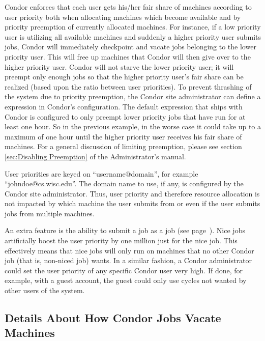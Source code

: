 Condor enforces that each user gets his/her fair share of machines
according to user priority both when allocating machines which become
available and by priority preemption of currently allocated machines.
For instance, if a low priority user is utilizing all available machines
and suddenly a higher priority user submits jobs, Condor will
immediately checkpoint and vacate jobs belonging to the lower priority
user. This will free up machines that Condor will then give over to the
higher priority user. Condor will not starve the lower priority user; it
will preempt only enough jobs so that the higher priority user's fair
share can be realized (based upon the ratio between user priorities). To
prevent thrashing of the system due to priority preemption, the Condor 
site administrator can define a  expression in Condor's configuration.
The default expression that ships with Condor is configured to only preempt 
lower priority jobs that have run
for at least one hour. So in the previous example, in the worse case it
could take up to a maximum of one hour until the higher priority user
receives his fair share of machines.
For a general discussion of
limiting preemption,
please see
section \ref{sec:Disabling Preemption} of the Administrator's manual.

User priorities are keyed on ``username@domain'', for example
``johndoe@cs.wisc.edu''. The domain name to use, if any, is configured by
the Condor site administrator.  Thus, user priority and therefore resource
allocation is not impacted by which machine the user submits from or
even if the user submits jobs from multiple machines.

An extra feature is the ability to submit a job as
a  job (see page~\pageref{man-condor-submit-nice}).
Nice jobs artificially boost the user priority 
by one million just for the nice job.
This effectively means that nice jobs will only run on
machines that no other Condor job (that is, non-niced job) wants.
In a similar fashion, a Condor administrator could set
the user priority of any specific Condor user very high.
If done, for example, with a guest account,
the guest could only use cycles not wanted by other users of the system.


\subsection{\label{sec:Vacate-Explained}
Details About How Condor Jobs Vacate Machines}

